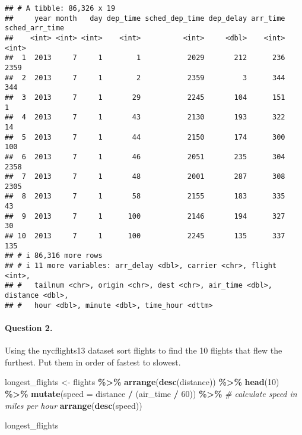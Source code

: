 \documentclass[
]{article}
\newenvironment{Shaded}{\begin{snugshade}}{\end{snugshade}}
\newcommand{\AttributeTok}[1]{\textcolor[rgb]{0.13,0.29,0.53}{#1}}
\newcommand{\CommentTok}[1]{\textcolor[rgb]{0.56,0.35,0.01}{\textit{#1}}}
\newcommand{\DecValTok}[1]{\textcolor[rgb]{0.00,0.00,0.81}{#1}}
\newcommand{\FunctionTok}[1]{\textcolor[rgb]{0.13,0.29,0.53}{\textbf{#1}}}
\newcommand{\NormalTok}[1]{#1}
\newcommand{\OtherTok}[1]{\textcolor[rgb]{0.56,0.35,0.01}{#1}}
\newcommand{\SpecialCharTok}[1]{\textcolor[rgb]{0.81,0.36,0.00}{\textbf{#1}}}
\begin{document}
\begin{verbatim}
## # A tibble: 86,326 x 19
##     year month   day dep_time sched_dep_time dep_delay arr_time sched_arr_time
##    <int> <int> <int>    <int>          <int>     <dbl>    <int>          <int>
##  1  2013     7     1        1           2029       212      236           2359
##  2  2013     7     1        2           2359         3      344            344
##  3  2013     7     1       29           2245       104      151              1
##  4  2013     7     1       43           2130       193      322             14
##  5  2013     7     1       44           2150       174      300            100
##  6  2013     7     1       46           2051       235      304           2358
##  7  2013     7     1       48           2001       287      308           2305
##  8  2013     7     1       58           2155       183      335             43
##  9  2013     7     1      100           2146       194      327             30
## 10  2013     7     1      100           2245       135      337            135
## # i 86,316 more rows
## # i 11 more variables: arr_delay <dbl>, carrier <chr>, flight <int>,
## #   tailnum <chr>, origin <chr>, dest <chr>, air_time <dbl>, distance <dbl>,
## #   hour <dbl>, minute <dbl>, time_hour <dttm>
\end{verbatim}

\hypertarget{question-2.}{%
\paragraph{Question 2.}\label{question-2.}}

Using the nycflights13 dataset sort flights to find the 10 flights that
flew the furthest. Put them in order of fastest to slowest.

\begin{Shaded}
\begin{Highlighting}[]
\NormalTok{longest\_flights }\OtherTok{\textless{}{-}}\NormalTok{ flights }\SpecialCharTok{\%\textgreater{}\%}
  \FunctionTok{arrange}\NormalTok{(}\FunctionTok{desc}\NormalTok{(distance)) }\SpecialCharTok{\%\textgreater{}\%}
  \FunctionTok{head}\NormalTok{(}\DecValTok{10}\NormalTok{) }\SpecialCharTok{\%\textgreater{}\%}
  \FunctionTok{mutate}\NormalTok{(}\AttributeTok{speed =}\NormalTok{ distance }\SpecialCharTok{/}\NormalTok{ (air\_time }\SpecialCharTok{/} \DecValTok{60}\NormalTok{)) }\SpecialCharTok{\%\textgreater{}\%}  \CommentTok{\# calculate speed in miles per hour}
  \FunctionTok{arrange}\NormalTok{(}\FunctionTok{desc}\NormalTok{(speed))}

\NormalTok{longest\_flights}
\end{Highlighting}
\end{Shaded}
\end{document}
